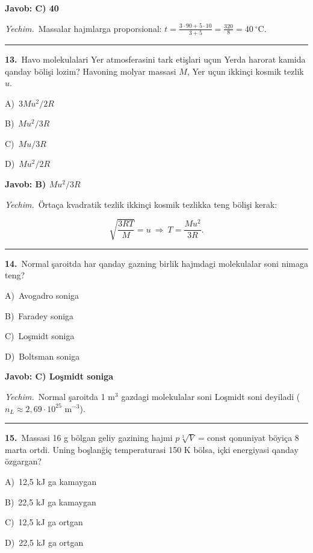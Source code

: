 \documentclass[11pt,a4paper]{article}
\newcommand{\opt}[2]{\hspace*{4mm}#1)\ #2\par}
\begin{document}
\noindent\colorbox{gray!12}{\parbox{\dimexpr\linewidth-2\fboxsep}{\textbf{Javob: C) 40}}}\par\smallskip
\noindent\textit{Yechim.}\ Massalar hajmlarga proporsional: $t=\frac{3\cdot90+5\cdot10}{3+5}=\frac{320}{8}=40\ ^\circ$C.\par\par\medskip\hrule\medskip
{}\noindent\begin{minipage}{\linewidth}
\textbf{13.}\ Havo molekulalari Yer atmosferasini tark etişlari uçun Yerda harorat kamida qanday bölişi lozim? Havoning molyar massasi $M$, Yer uçun ikkinçi kosmik tezlik $u$.\par\smallskip
\opt{A}{$3Mu^2/2R$}
\opt{B}{$Mu^2/3R$}
\opt{C}{$Mu/3R$}
\opt{D}{$Mu^2/2R$}
\end{minipage}\vspace{2pt}\par
\noindent\colorbox{gray!12}{\parbox{\dimexpr\linewidth-2\fboxsep}{\textbf{Javob: B) $Mu^2/3R$}}}\par\smallskip
\noindent\textit{Yechim.}\ Örtaça kvadratik tezlik ikkinçi kosmik tezlikka teng bölişi kerak:\par
\[\sqrt{\frac{3RT}{M}}=u\ \Rightarrow\ T=\frac{Mu^2}{3R}.\]\par\medskip\hrule\medskip
{}\noindent\begin{minipage}{\linewidth}
\textbf{14.}\ Normal şaroitda har qanday gazning birlik hajmdagi molekulalar soni nimaga teng?\par\smallskip
\opt{A}{Avogadro soniga}
\opt{B}{Faradey soniga}
\opt{C}{Loşmidt soniga}
\opt{D}{Boltsman soniga}
\end{minipage}\vspace{2pt}\par
\noindent\colorbox{gray!12}{\parbox{\dimexpr\linewidth-2\fboxsep}{\textbf{Javob: C) Loşmidt soniga}}}\par\smallskip
\noindent\textit{Yechim.}\ Normal şaroitda 1 m$^3$ gazdagi molekulalar soni Loşmidt soni deyiladi ($n_L\approx2{,}69\cdot10^{25}$ m$^{-3}$).\par\par\medskip\hrule\medskip
{}\noindent\begin{minipage}{\linewidth}
\textbf{15.}\ Massasi 16 g bölgan geliy gazining hajmi $p\sqrt[3]{V}=\mathrm{const}$ qonuniyat böyiça 8 marta ortdi. Uning boşlanğiç temperaturasi 150 K bölsa, içki energiyasi qanday özgargan?\par\smallskip
\opt{A}{12,5 kJ ga kamaygan}
\opt{B}{22,5 kJ ga kamaygan}
\opt{C}{12,5 kJ ga ortgan}
\opt{D}{22,5 kJ ga ortgan}
\end{minipage}\vspace{2pt}\par
\end{document}
